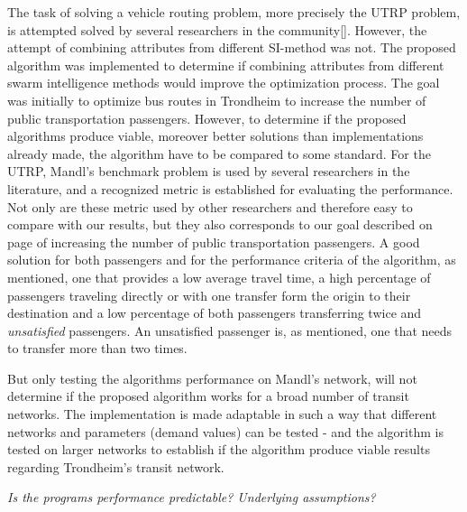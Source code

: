 
The task of solving a vehicle routing problem, more precisely the UTRP problem, is attempted solved by several researchers in the community[]. However, the attempt of combining attributes from different SI-method was not. The proposed algorithm was implemented to determine if combining attributes from different swarm intelligence methods would improve the optimization process. The goal was initially to optimize bus routes in Trondheim to increase the number of public transportation passengers. However, to determine if the proposed algorithms produce viable, moreover better solutions than implementations already made, the algorithm have to be compared to some standard. For the UTRP, Mandl's benchmark problem is used by several researchers in the literature, and a recognized metric is established for evaluating the performance.  Not only are these metric used by other researchers and therefore easy to compare with our results, but they also corresponds to our goal described on page \pageref{itm:goal} of increasing the number of public transportation passengers. A good solution for both passengers and for the performance criteria of the algorithm, as mentioned, one that provides a low average travel time, a high percentage of passengers traveling directly or with one transfer form the origin to their destination and a low percentage of both passengers transferring twice and \textit{unsatisfied} passengers. An unsatisfied passenger is, as mentioned, one that needs to transfer more than two times. 

But only testing the algorithms performance on Mandl's network, will not determine if the proposed algorithm works for a broad number of transit networks. The implementation is made adaptable in such a way that different networks and parameters (demand values) can be tested - and the algorithm is tested on larger networks to establish if the algorithm produce viable results regarding Trondheim's transit network.

\emph{\color{blue}Is the programs performance predictable? Underlying assumptions?}